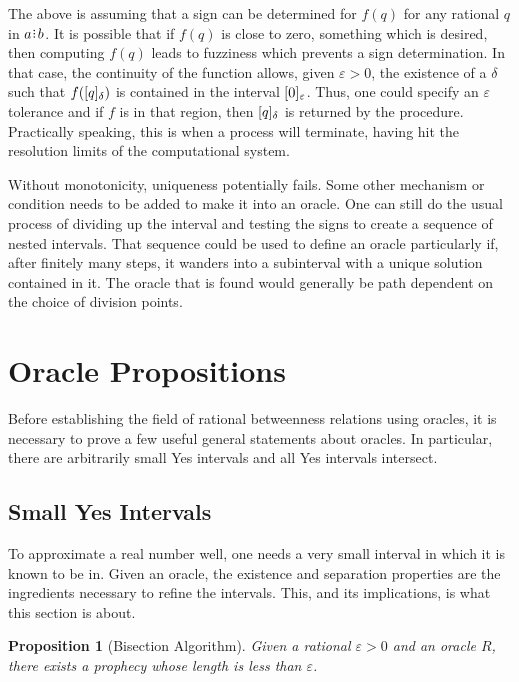 \documentclass[12pt]{article}
\newtheorem{proposition}{Proposition}[section]
\begin{document}
The above is assuming that a sign can be determined for $f(q)$ for any rational $q$ in $a\rint b$. It is possible that if $f(q)$ is close to zero, something which is desired, then computing $f(q)$ leads to fuzziness which prevents a sign determination. In that case, the continuity of the function allows, given $\varepsilon > 0$, the existence of a $\delta$ such that $f(\halo{q})$ is contained in the interval $\halo[\varepsilon]{0}$. Thus, one could specify an $\varepsilon$ tolerance and if $f$ is in that region, then $\halo{q}$ is returned by the procedure. Practically speaking, this is when a process will terminate, having hit the resolution limits of the computational system. 

Without monotonicity, uniqueness potentially fails. Some other mechanism or condition needs to be added to make it into an oracle. One can still do the usual process of dividing up the interval and testing the signs to create a sequence of nested intervals. That sequence could be used to define an oracle particularly if, after finitely many steps, it wanders into a subinterval with a unique solution contained in it. The oracle that is found would generally be path dependent on the choice of division points. 

\section{Oracle Propositions}

Before establishing the field of rational betweenness relations using oracles, it is necessary to prove a few useful general statements about oracles. In particular, there are arbitrarily small Yes intervals and all Yes intervals intersect. 

\subsection{Small Yes Intervals}

To approximate a real number well, one needs a very small interval in which it is known to be in. Given an oracle, the existence and separation properties are the ingredients necessary to refine the intervals. This, and its implications, is what this section is about. 


\begin{proposition}[Bisection Algorithm]
    Given a rational $\varepsilon >0$ and an oracle $R$, there exists a prophecy whose length is less than $\varepsilon$.
\end{proposition}
\end{document}
